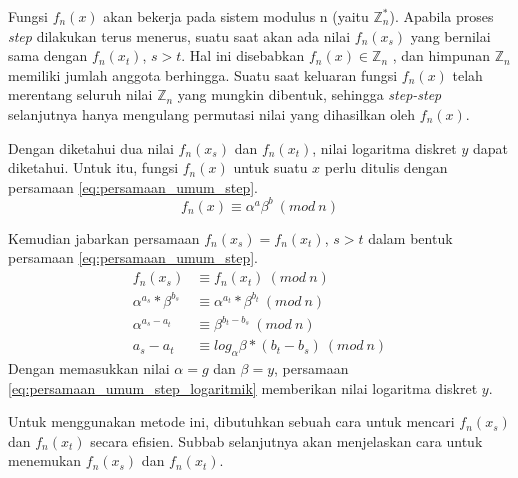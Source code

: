 Fungsi $ f_n (x) $ akan bekerja pada sistem modulus n (yaitu $ \mathbb{Z}_n^* $). Apabila proses \textit{step} dilakukan terus menerus, suatu saat akan ada nilai $ f_n (x_s) $ yang bernilai sama dengan $ f_n (x_t) $, $ s>t $. Hal ini disebabkan $ f_n (x) \in \mathbb{Z}_n $ , dan himpunan $ \mathbb{Z}_n $ memiliki jumlah anggota berhingga. Suatu saat keluaran fungsi $ f_n (x) $ telah merentang seluruh nilai $ \mathbb{Z}_n $ yang mungkin dibentuk, sehingga \textit{step-step} selanjutnya hanya mengulang permutasi nilai yang dihasilkan oleh $ f_n (x) $.\cite{brent_montecarlo}

Dengan diketahui dua nilai $ f_n (x_s) $ dan $ f_n (x_t) $, nilai logaritma diskret $ y $ dapat diketahui. Untuk itu, fungsi $ f_n (x) $ untuk suatu $ x $ perlu ditulis dengan persamaan \eqref{eq:persamaan_umum_step}.
\begin{equation}
f_n (x)\equiv \alpha^a \beta^b\ (mod\ n)
\label{eq:persamaan_umum_step}
\end{equation}

Kemudian jabarkan persamaan $ f_n (x_s)=f_n (x_t) $, $ s>t $ dalam bentuk persamaan \eqref{eq:persamaan_umum_step}.
\begin{align}
f_n (x_s) &\equiv f_n (x_t)\ (mod\ n) \\
\alpha^{a_s} * \beta^{b_s} &\equiv \alpha^{a_t} * \beta^{b_t}\ (mod\ n) \\
\alpha^{a_s-a_t} &\equiv \beta^{b_t-b_s}\ (mod\ n) \\
a_s - a_t &\equiv log_{\alpha} \beta * (b_t - b_s)\ (mod\ n)
\label{eq:persamaan_umum_step_logaritmik}
\end{align}
Dengan memasukkan nilai $ \alpha=g $ dan $ \beta=y $, persamaan \eqref{eq:persamaan_umum_step_logaritmik} memberikan nilai logaritma diskret $ y $.

Untuk menggunakan metode ini, dibutuhkan sebuah cara untuk mencari $ f_n (x_s) $ dan $ f_n (x_t) $ secara efisien. Subbab selanjutnya akan menjelaskan cara untuk menemukan $ f_n (x_s) $ dan $ f_n (x_t) $.

